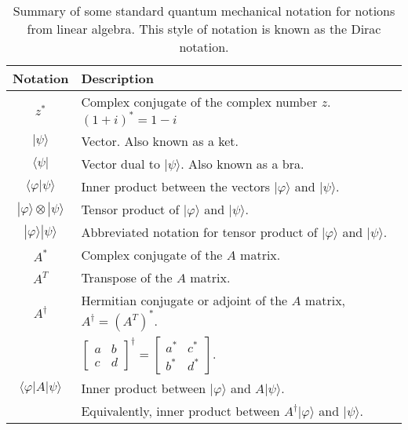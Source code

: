 \begin{table}[]
    \centering
    \begin{tabular}{c|l}
        \hline\hline
        Notation & Description \\
        \hline
        $z^{*}$ & Complex conjugate of the complex number $z$. $(1+i)^{*}=1-i$\\
        $|\psi\rangle$& Vector. Also known as a ket. \\
        $\langle\psi|$& Vector dual to $|\psi\rangle$. Also known as a bra. \\
        $\langle\varphi | \psi\rangle$& Inner product between the vectors $|\varphi\rangle$ and $|\psi\rangle$. \\
        $|\varphi\rangle \otimes|\psi\rangle$& Tensor product of $|\varphi\rangle$ and $|\psi\rangle$. \\
        $|\varphi\rangle|\psi\rangle$& Abbreviated notation for tensor product of $|\varphi\rangle$ and $|\psi\rangle$. \\
        $A^{*}$& Complex conjugate of the $A$ matrix. \\
        $A^{T}$& Transpose of the $A$ matrix. \\
         $A^{\dagger}$& Hermitian conjugate or adjoint of the $A$ matrix, $A^{\dagger}=\left(A^{T}\right)^{*}$. \\
         & $\left[\begin{array}{cc}a & b \\ c & d\end{array}\right]^{\dagger}=\left[\begin{array}{cc}a^{*} & c^{*} \\ b^{*} & d^{*}\end{array}\right]$. \\
        $\langle\varphi|A| \psi\rangle$ & Inner product between $|\varphi\rangle$ and $A|\psi\rangle$. \\
         & Equivalently, inner product between $A^{\dagger}|\varphi\rangle$ and $|\psi\rangle$. \\
        \hline\hline
    \end{tabular}
\caption{Summary of some standard quantum mechanical notation for notions from linear algebra. This style of notation is known as the Dirac notation.}
\label{tab:summary_AL}
\end{table}